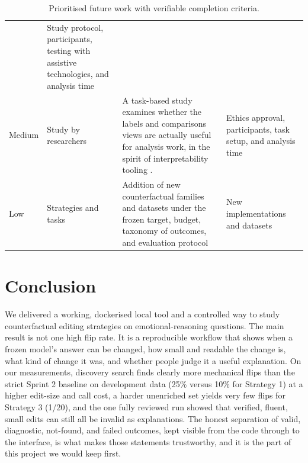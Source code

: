 \documentclass[11pt,a4paper]{article}
\begin{document}
\begin{table}[!htbp]
\begin{tabularx}{\textwidth}{@{}L{1.05cm}L{2.5cm}Y Y@{}}
& Study protocol, participants, testing with assistive technologies, and analysis time \\
Medium & Study by researchers & A task-based study examines whether the labels and
comparisons views are actually useful for analysis work, in the spirit of
interpretability tooling \cite{tenney2020}. & Ethics approval, participants, task setup, and analysis
time \\
Low & Strategies and tasks & Addition of new counterfactual families and datasets under
the frozen target, budget, taxonomy of outcomes, and evaluation protocol & New
implementations and datasets \\
\bottomrule
\end{tabularx}
\caption{Prioritised future work with verifiable completion criteria.}
\label{tab:future}
\end{table}

\clearpage

\section{Conclusion}

We delivered a working, dockerised local tool and a controlled way to study
counterfactual editing strategies on emotional-reasoning questions. The main result is
not one high flip rate. It is a reproducible workflow that shows when a frozen model's
answer can be changed, how small and readable the change is, what kind of change it
was, and whether people judge it a useful explanation. On our measurements, discovery
search finds clearly more mechanical flips than the strict Sprint 2 baseline on
development data (25\% versus 10\% for Strategy 1) at a higher edit-size and call
cost, a harder unenriched set yields very few flips for Strategy 3 (1/20), and the one
fully reviewed run showed that verified, fluent, small edits can still all be invalid
as explanations. The honest separation of valid, diagnostic, not-found, and failed
outcomes, kept visible from the code through to the interface, is what makes those
statements trustworthy, and it is the part of this project we would keep first.
\end{document}
